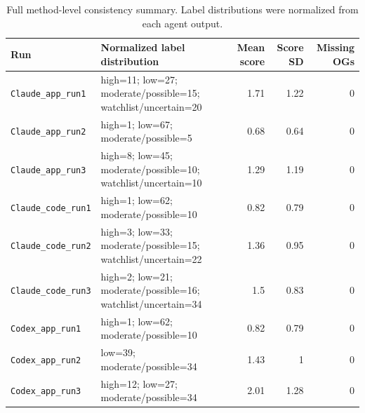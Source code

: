﻿\begin{table}[ht]
\centering
\small
\caption{Full method-level consistency summary. Label distributions were normalized from each agent output.}
\label{tab:s_method_summary}
\begin{tabularx}{\linewidth}{lYrrr}
\toprule
Run & Normalized label distribution & Mean score & Score SD & Missing OGs\\
\midrule
\texttt{Claude\_app\_run1} & high=11; low=27; moderate/possible=15; watchlist/uncertain=20 & 1.71 & 1.22 & 0\\
\texttt{Claude\_app\_run2} & high=1; low=67; moderate/possible=5 & 0.68 & 0.64 & 0\\
\texttt{Claude\_app\_run3} & high=8; low=45; moderate/possible=10; watchlist/uncertain=10 & 1.29 & 1.19 & 0\\
\texttt{Claude\_code\_run1} & high=1; low=62; moderate/possible=10 & 0.82 & 0.79 & 0\\
\texttt{Claude\_code\_run2} & high=3; low=33; moderate/possible=15; watchlist/uncertain=22 & 1.36 & 0.95 & 0\\
\texttt{Claude\_code\_run3} & high=2; low=21; moderate/possible=16; watchlist/uncertain=34 & 1.5 & 0.83 & 0\\
\texttt{Codex\_app\_run1} & high=1; low=62; moderate/possible=10 & 0.82 & 0.79 & 0\\
\texttt{Codex\_app\_run2} & low=39; moderate/possible=34 & 1.43 & 1 & 0\\
\texttt{Codex\_app\_run3} & high=12; low=27; moderate/possible=34 & 2.01 & 1.28 & 0\\
\bottomrule
\end{tabularx}
\end{table}
